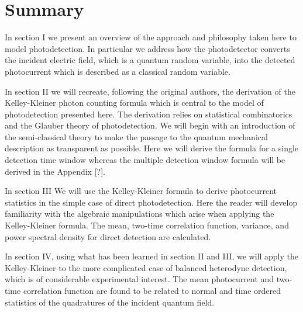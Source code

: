\documentclass[12pt]{article}
\begin{document}


\section*{Summary}
In section I we present an overview of the approach and philosophy taken here to model photodetection. In particular we address how the photodetector converts the incident electric field, which is a quantum random variable, into the detected photocurrent which is described as a classical random variable.

In section II we will recreate, following the original authors, the derivation of the Kelley-Kleiner photon counting formula which is central to the model of photodetection presented here. The derivation relies on statistical combinatorics and the Glauber theory of photodetection. We will begin with an introduction of the semi-classical theory to make the passage to the quantum mechanical description as transparent as possible. Here we will derive the formula for a single detection time window whereas the multiple detection window formula will be derived in the Appendix [?].

In section III We will use the Kelley-Kleiner formula to derive photocurrent statistics in the simple case of direct photodetection. Here the reader will develop familiarity with the algebraic manipulations which arise when applying the Kelley-Kleiner formula. The mean, two-time correlation function, variance, and power spectral density for direct detection are calculated.


In section IV, using what has been learned in section II and III, we will apply the Kelley-Kleiner to the more complicated case of balanced heterodyne detection, which is of considerable experimental interest. The mean photocurrent and two-time correlation function are found to be related to normal and time ordered statistics of the quadratures of the incident quantum field. 
\end{document}
